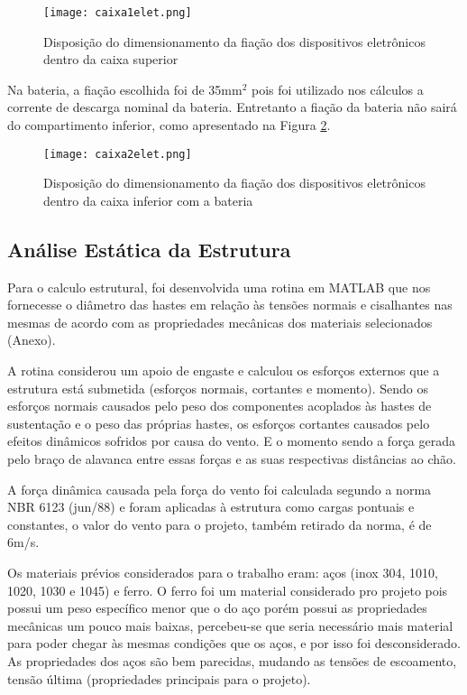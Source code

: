 \begin{figure}[h]
	\centering
    \texttt{[image: caixa1elet.png]}
    \caption{Disposição do dimensionamento da fiação dos dispositivos eletrônicos dentro da caixa superior}
    \label{caixa1elet}
\end{figure}


 Na bateria, a fiação escolhida foi de 35mm$^2$ pois foi utilizado nos cálculos a corrente de descarga nominal da bateria. Entretanto a fiação da bateria não sairá do compartimento inferior, como apresentado na Figura \ref{caixa2elet}.

\begin{figure}[h]
	\centering
    \texttt{[image: caixa2elet.png]}
    \caption{Disposição do dimensionamento da fiação dos dispositivos eletrônicos dentro da caixa inferior com a bateria}
    \label{caixa2elet}
\end{figure}



\subsection{Análise Estática da Estrutura}

Para o calculo estrutural, foi desenvolvida uma rotina em MATLAB que nos fornecesse o diâmetro das hastes em relação às tensões normais e cisalhantes nas mesmas de acordo com as propriedades mecânicas dos materiais selecionados (Anexo).

A rotina considerou um apoio de engaste e calculou os esforços externos que a estrutura está submetida (esforços normais, cortantes e momento). Sendo os esforços normais causados pelo peso dos componentes acoplados às hastes de sustentação e o peso das próprias hastes, os esforços cortantes causados pelo efeitos dinâmicos sofridos por causa do vento. E o momento sendo a força gerada pelo braço de alavanca entre essas forças e as suas respectivas distâncias ao chão.

A força dinâmica causada pela força do vento foi calculada segundo a norma NBR 6123 (jun/88) \cite{vento} e foram aplicadas à estrutura como cargas pontuais e constantes, o valor do vento para o projeto, também retirado da norma, é de 6m/s.	

Os materiais prévios considerados para o trabalho eram: aços (inox 304, 1010, 1020, 1030 e 1045) e ferro. O ferro foi um material considerado pro projeto pois possui um peso específico menor que o do aço porém possui as propriedades mecânicas um pouco mais baixas, percebeu-se que seria necessário mais material para poder chegar às mesmas condições que os aços, e por isso foi desconsiderado. As propriedades dos aços são bem parecidas, mudando as tensões de escoamento, tensão última (propriedades principais para o projeto).
	
